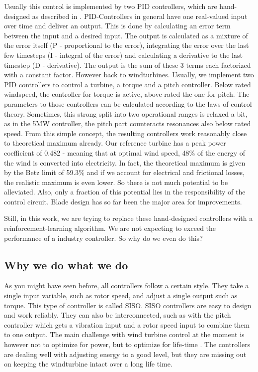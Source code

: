 \documentclass[hyperref,german,beleg]{cgvpub}
\begin{document}
Usually this control is implemented by two PID controllers, which are hand-designed as described in \cite[sec 8.4]{burtonWindEnergyHandbook2011}. PID-Controllers in general have one real-valued input over time and deliver an output. This is done by calculating an error term between the input and a desired input. The output is calculated as a mixture of the error itself (P - proportional to the error), integrating the error over the last few timesteps (I - integral of the error) and calculating a derivative to the last timestep (D - derivative). The output is the sum of these 3 terms each factorized with a constant factor.
However back to windturbines. Usually, we implement two PID controllers to control a turbine, a torque and a pitch controller. Below rated windspeed, the controller for torque is active, above rated the one for pitch. The parameters to those controllers can be calculated according to the laws of control theory. Sometimes, this strong split into two operational ranges is relaxed a bit, as in the 5MW controller, the pitch part counteracts resonances also below rated speed. From this simple concept, the resulting controllers work reasonably close to theoretical maximum already. Our reference turbine has a peak power coefficient of 0.482 - meaning that at optimal wind speed, 48\% of the energy of the wind is converted into electricity. In fact, the theoretical maximum is given by the Betz limit of 59.3\% and if we account for electrical and frictional losses, the realistic maximum is even lower. So there is not much potential to be alleviated. Also, only a fraction of this potential lies in the responsibility of the control circuit. Blade design has so far been the major area for improvements.

Still, in this work, we are trying to replace these hand-designed controllers with a reinforcement-learning algorithm. We are not expecting to exceed the performance of a industry controller. So why do we even do this?

\subsection{Why we do what we do}
As you might have seen before, all controllers follow a certain style. They take a single input variable, such as rotor speed, and adjust a single output such as torque. This type of controller is called \ac{SISO}. \ac{SISO} controllers are easy to design and work reliably. They can also be interconnected, such as with the pitch controller which gets a vibration input and a rotor speed input to combine them to one output. The main challenge with wind turbine control at the moment is however not to optimize for power, but to optimize for life-time \cite[Chapter 4]{vankuikLongtermResearchChallenges2016}. The controllers are dealing well with adjusting energy to a good level, but they are missing out on keeping the windturbine intact over a long life time.
\end{document}
